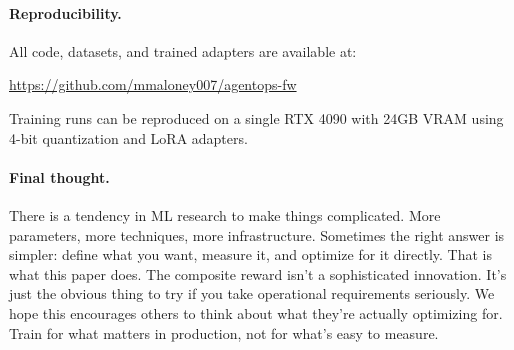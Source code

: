 \documentclass[11pt]{article}
\begin{document}
\paragraph{Reproducibility.}
All code, datasets, and trained adapters are available at:
\begin{center}
\url{https://github.com/mmaloney007/agentops-fw}
\end{center}
Training runs can be reproduced on a single RTX 4090 with 24GB VRAM using 4-bit quantization and LoRA adapters.

\paragraph{Final thought.}
There is a tendency in ML research to make things complicated.
More parameters, more techniques, more infrastructure.
Sometimes the right answer is simpler: define what you want, measure it, and optimize for it directly.
That is what this paper does.
The composite reward isn't a sophisticated innovation.  It's just the obvious thing to try if you take operational requirements seriously.
We hope this encourages others to think about what they're actually optimizing for.  Train for what matters in production, not for what's easy to measure.



\end{document}
